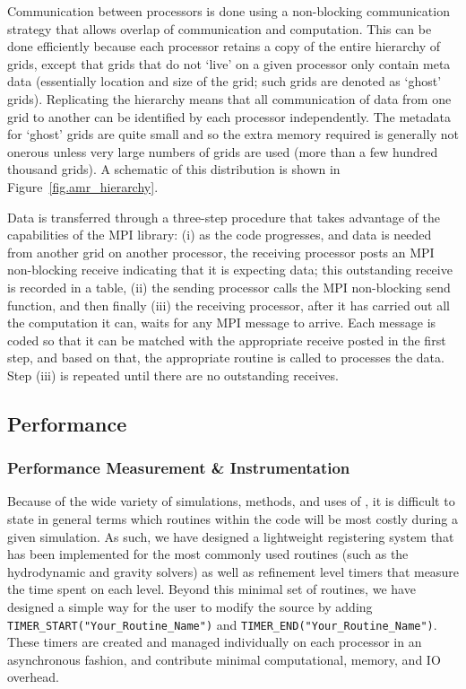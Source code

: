 Communication between processors is done using a non-blocking
communication strategy that allows overlap of communication and
computation.  This can be done efficiently because each processor
retains a copy of the entire hierarchy of grids, except that grids
that do not `live' on a given processor only contain meta data
(essentially location and size of the grid; such grids are denoted as
`ghost' grids).  Replicating the hierarchy means that all
communication of data from one grid to another can be identified by
each processor independently.  The metadata for `ghost' grids are
quite small and so the extra memory required is generally not onerous
unless very large numbers of grids are used (more than a few hundred
thousand grids).  A schematic of this distribution is shown in
Figure~\ref{fig.amr_hierarchy}.

Data is transferred through a three-step procedure that takes
advantage of the capabilities of the MPI library: (i) as the code
progresses, and data is needed from another grid on another processor,
the receiving processor posts an MPI non-blocking receive indicating
that it is expecting data; this outstanding receive is recorded in a
table, (ii) the sending processor calls the MPI non-blocking send
function, and then finally (iii) the receiving processor, after it has
carried out all the computation it can, waits for any MPI message to
arrive.  Each message is coded so that it can be matched with the
appropriate receive posted in the first step, and based on that, the
appropriate routine is called to processes the data.  Step (iii) is
repeated until there are no outstanding receives.


\subsection{Performance}
\label{sec.performance}

\subsubsection{Performance Measurement \& Instrumentation}

Because of the wide variety of simulations, methods, and uses of \enzo,
it is difficult to state in general terms which routines within the
code will be most costly during a given simulation.  As such, we have
designed a lightweight registering system that has been implemented
for the most commonly used routines (such as the hydrodynamic and
gravity solvers) as well as refinement level timers that measure the
time spent on each level.  Beyond this minimal set of routines, we
have designed a simple way for the user to modify the source by adding
\texttt{TIMER\_START("Your\_Routine\_Name")} and
\texttt{TIMER\_END("Your\_Routine\_Name")}.  These timers are created
and managed individually on each processor in an asynchronous fashion,
and contribute minimal computational, memory, and IO overhead.

